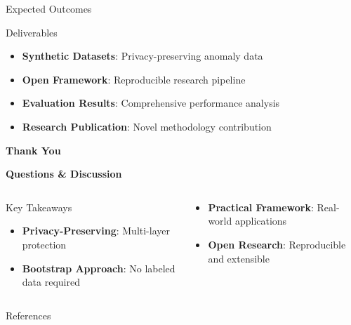 \documentclass[aspectratio=169,xcolor={dvipsnames}]{beamer}
\begin{document}
\begin{frame}{Expected Outcomes}
  \begin{block}{Deliverables}
    \begin{itemize}
      \item \textbf{Synthetic Datasets}: Privacy-preserving anomaly data
      \item \textbf{Open Framework}: Reproducible research pipeline
      \item \textbf{Evaluation Results}: Comprehensive performance analysis
      \item \textbf{Research Publication}: Novel methodology contribution
    \end{itemize}
  \end{block}
\end{frame}

\begin{frame}[plain]
  \centering
  \Huge \textbf{Thank You}
  
  \vspace{0.5em}
  \Large \textbf{Questions \& Discussion}
  
  \vspace{1em}
  \begin{columns}[T,onlytextwidth]
    \begin{column}{0.48\textwidth}
      \begin{block}{Key Takeaways}
        \begin{itemize}
          \item \textbf{Privacy-Preserving}: Multi-layer protection
          \item \textbf{Bootstrap Approach}: No labeled data required
        \end{itemize}
      \end{block}
    \end{column}
    \hspace{0.04\textwidth}
    \begin{column}{0.48\textwidth}
      \begin{block}{}
        \begin{itemize}
          \item \textbf{Practical Framework}: Real-world applications
          \item \textbf{Open Research}: Reproducible and extensible
        \end{itemize}
      \end{block}
    \end{column}
  \end{columns}
\end{frame}

\begin{frame}[allowframebreaks]{References}
  \begin{block}{}
    \small
    \printbibliography[heading=none]
  \end{block}
\end{frame}
\end{document}

